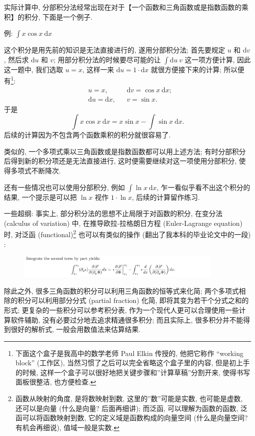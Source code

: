 实际计算中,
分部积分法经常出现在对于【一个函数和三角函数或是指数函数的乘积】的积分,
下面是一个例子.

\begin{newquote}
例: \(\int x\cos x\ \mathrm{d}x\)

这个积分是用先前的知识是无法直接进行的, 遂用分部积分法; 首先要规定 \(u\)
和 \(\mathrm{d}v\), 然后求 \(\mathrm{d}u\) 和 \(v\);
用部分积分法的时候要尽可能的让 \(\int \mathrm{d}u\ v\) 这一项方便计算,
因此这一题中, 我们选取 \(u=x\), 这样一来
\(\mathrm{d}u=1\cdot\mathrm{d}x\) 就很方便接下来的计算;
所以便有\footnote{下面这个盒子是我高中的数学老师 Paul Elkin 传授的,
  他把它称作 ``working block'' (工作区),
  当然习惯了之后可以完全省略这个盒子里的内容, 但是初上手的时候,
  这样一个盒子可以很好地把关键步骤和''计算草稿''分割开来,
  使得书写面板很整洁, 也方便检查.}: \[
\boxed{\begin{aligned}
&u=x,&&\mathrm{d}v=\cos x\ \mathrm{d}x;\\
&\mathrm{d}u=\mathrm{d}x,&&v=\sin x.
\end{aligned}}
\] 于是 \[
\int x\cos x\ \mathrm{d}x=x\sin x-\int\sin x\ \mathrm{d}x.
\] 后续的计算因为不包含两个函数乘积的积分就很容易了.

类似的, 一个多项式乘以三角函数或是指数函数都可以用上述方法;
有时分部积分后得到新的积分项还是无法直接进行,
这时便需要继续对这一项使用分部积分, 使得多项式不断降次.

还有一些情况也可以使用分部积分, 例如 \(\int\ln x\ \mathrm{d}x\),
乍一看似乎看不出这个积分的结果, 一个提示是可以把 \(\ln x\) 视作
\(1\cdot\ln x\), 后续的计算留作练习.
\end{newquote}

一些超纲: 事实上, 部分积分法的思想不止局限于对函数的积分, 在变分法
(calculus of variation) 中, 在推导欧拉-拉格朗日方程 (Euler-Lagrange
equation) 时, 对泛函 (functional)\footnote{函数从映射的角度,
  是将数映射到数, 这里的''数''可能是实数, 也可能是虚数, 还可以是向量
  (什么是向量? 后面再细讲); 而泛函, 可以理解为函数的函数,
  泛函可以将函数映射到数, 它的定义域是函数构成的向量空间
  (什么是向量空间? 有机会再细说), 值域一般是实数.} 也可以有类似的操作
(翻出了我本科的毕业论文中的一段) :

\begin{figure}[!h]
\centering
\includegraphics[width=0.9\textwidth]{img/image-20231101180718605.png}
\end{figure}

除此之外, 很多三角函数的积分可以利用三角函数的恒等式来化简;
两个多项式相除的积分可以利用部分分式 (partial fraction) 化简,
即将其变为若干个分式之和的形式; 更复杂的一些积分可以参考积分表,
作为一个现代人更可以合理使用一些计算软件辅助,
没有必要过分地去追求精通很多积分; 而且实际上,
很多积分并不能得到很好的解析式, 一般会用数值法来估算结果.
